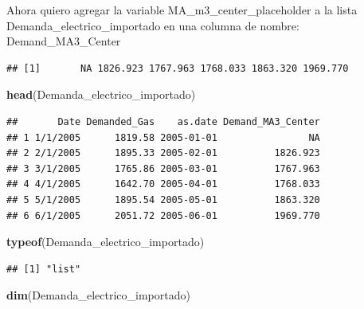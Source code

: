 \documentclass[
]{article}
\newenvironment{Shaded}{\begin{snugshade}}{\end{snugshade}}
\newcommand{\FunctionTok}[1]{\textcolor[rgb]{0.13,0.29,0.53}{\textbf{#1}}}
\newcommand{\NormalTok}[1]{#1}
\newcommand{\OtherTok}[1]{\textcolor[rgb]{0.56,0.35,0.01}{#1}}
\newcommand{\SpecialCharTok}[1]{\textcolor[rgb]{0.81,0.36,0.00}{\textbf{#1}}}
\begin{document}
Ahora quiero agregar la variable MA\_m3\_center\_placeholder a la lista
Demanda\_electrico\_importado en una columna de nombre:
Demand\_MA3\_Center

\begin{Shaded}
\end{Shaded}

\begin{verbatim}
## [1]       NA 1826.923 1767.963 1768.033 1863.320 1969.770
\end{verbatim}

\begin{Shaded}
\begin{Highlighting}[]
\FunctionTok{head}\NormalTok{(Demanda\_electrico\_importado)}
\end{Highlighting}
\end{Shaded}

\begin{verbatim}
##       Date Demanded_Gas    as.date Demand_MA3_Center
## 1 1/1/2005      1819.58 2005-01-01                NA
## 2 2/1/2005      1895.33 2005-02-01          1826.923
## 3 3/1/2005      1765.86 2005-03-01          1767.963
## 4 4/1/2005      1642.70 2005-04-01          1768.033
## 5 5/1/2005      1895.54 2005-05-01          1863.320
## 6 6/1/2005      2051.72 2005-06-01          1969.770
\end{verbatim}

\begin{Shaded}
\begin{Highlighting}[]
\FunctionTok{typeof}\NormalTok{(Demanda\_electrico\_importado)}
\end{Highlighting}
\end{Shaded}

\begin{verbatim}
## [1] "list"
\end{verbatim}

\begin{Shaded}
\begin{Highlighting}[]
\FunctionTok{dim}\NormalTok{(Demanda\_electrico\_importado)}
\end{Highlighting}
\end{Shaded}
\end{document}
